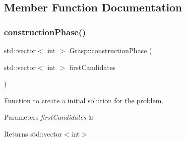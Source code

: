 \subsection{Member Function Documentation}
\mbox{\label{classGrasp_aef091e71dd747ebcb78e1ebcdcf44221}} 
\subsubsection{\texorpdfstring{construction\+Phase()}{constructionPhase()}}
{\footnotesize\ttfamily std\+::vector$<$ int $>$ Grasp\+::construction\+Phase (\begin{DoxyParamCaption}\item[{std\+::vector$<$ int $>$}]{first\+Candidates }\end{DoxyParamCaption})}



Function to create a initial solution for the problem. 


\begin{DoxyParams}{Parameters}
{\em first\+Candidates} & \\
\hline
\end{DoxyParams}
\begin{DoxyReturn}{Returns}
std\+::vector$<$int$>$ 
\end{DoxyReturn}

